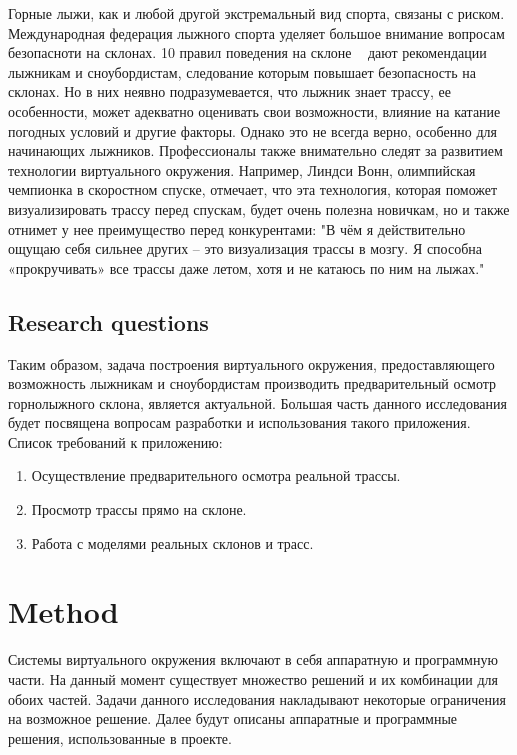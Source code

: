 \documentclass[twoside]{article}
\begin{document}
Горные лыжи, как и любой другой экстремальный вид спорта, связаны с риском.
Международная федерация лыжного спорта уделяет большое внимание вопросам безопасноти на склонах.
10 правил поведения на склоне ~\cite{fis-10-rules-bib8} дают рекомендации лыжникам и сноубордистам, 
следование которым повышает безопасность на склонах.
Но в них неявно подразумевается, что лыжник знает трассу, ее особенности, может адекватно оценивать свои возможности, 
влияние на катание погодных условий и другие факторы.
Однако это не всегда верно, особенно для начинающих лыжников.
Профессионалы также внимательно следят за развитием технологии виртуального окружения.
Например, Линдси Вонн, олимпийская чемпионка в скоростном спуске, отмечает, что эта технология,
которая поможет визуализировать трассу перед спускам, будет очень полезна новичкам, но и также 
отнимет у нее преимущество перед конкурентами: 
"В чём я действительно ощущаю себя сильнее других – это визуализация трассы в мозгу. 
Я способна «прокручивать» все трассы даже летом, хотя и не катаюсь по ним на лыжах."

\subsection{Research questions}
Таким образом, задача построения виртуального окружения, предоставляющего возможность лыжникам и сноубордистам
производить предварительный осмотр горнолыжного склона, является актуальной.
Большая часть данного исследования будет посвящена вопросам разработки и использования такого приложения.
Список требований к приложению:

\begin{enumerate}
	\item Осуществление предварительного осмотра реальной трассы.
	\item Просмотр трассы прямо на склоне.
	\item Работа с моделями реальных склонов и трасс.
\end{enumerate}


\section{Method}\label{method}
Системы виртуального окружения включают в себя аппаратную и программную части.
На данный момент существует множество решений и их комбинации для обоих частей.
Задачи данного исследования накладывают некоторые ограничения на возможное решение.
Далее будут описаны аппаратные и программные решения, использованные в проекте.
\end{document}
